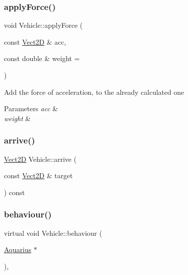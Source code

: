 \mbox{\label{classVehicle_a82fbbd5aafc1ba89c3daa4da09989bbe_a82fbbd5aafc1ba89c3daa4da09989bbe}} 
\subsubsection{\texorpdfstring{apply\+Force()}{applyForce()}}
{\footnotesize\ttfamily void Vehicle\+::apply\+Force (\begin{DoxyParamCaption}\item[{const \hyperlink{classVect2D}{Vect2D} \&}]{acc,  }\item[{const double \&}]{weight = {} }\end{DoxyParamCaption})}

Add the force of acceleration, to the already calculated one 
\begin{DoxyParams}{Parameters}
{\em acc} & \\
\hline
{\em weight} & \\
\hline
\end{DoxyParams}
\mbox{\label{classVehicle_a55f8bb6cfbdd97219c2cea6cf3ad3826_a55f8bb6cfbdd97219c2cea6cf3ad3826}} 
\subsubsection{\texorpdfstring{arrive()}{arrive()}}
{\footnotesize\ttfamily \hyperlink{classVect2D}{Vect2D} Vehicle\+::arrive (\begin{DoxyParamCaption}\item[{const \hyperlink{classVect2D}{Vect2D} \&}]{target }\end{DoxyParamCaption}) const}

\mbox{\label{classVehicle_a7b8b7578202a306a4dc08d587dc70f17_a7b8b7578202a306a4dc08d587dc70f17}} 
\subsubsection{\texorpdfstring{behaviour()}{behaviour()}}
{\footnotesize\ttfamily virtual void Vehicle\+::behaviour (\begin{DoxyParamCaption}\item[{\hyperlink{classAquarius}{Aquarius} $\ast$}]{ }\end{DoxyParamCaption})\hspace{0.3cm}{\ttfamily [protected]}, {}}

